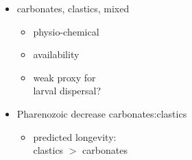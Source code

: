 \documentclass{beamer}
\begin{document}
\begin{frame}
\begin{columns}
\begin{column}{0.5\textwidth}
\begin{center}
        \tiny{}
      \end{center}
    \end{column}
    \begin{column}{0.5\textwidth}
      \begin{itemize}
        \item carbonates, clastics, mixed
          \begin{itemize}
            \item physio-chemical 
            \item availability
            \item weak proxy for \\larval dispersal?
          \end{itemize}
        \item Pharenozoic decrease carbonates:clastics
          \begin{itemize}
            \item predicted longevity: \\clastics \(>\) carbonates
          \end{itemize}
      \end{itemize}
    \end{column}
  \end{columns}
\end{frame}
\end{document}
